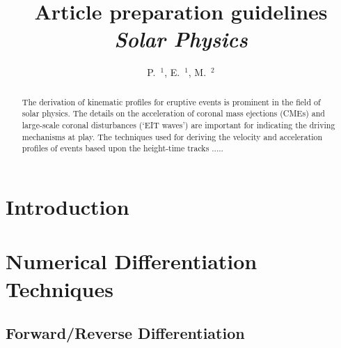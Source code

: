 \documentclass[namedreferences]{SolarPhysics}
\begin{document}
\begin{article}

\begin{opening}

\title{Article preparation guidelines\\ {\it Solar Physics}}

\author{P.~$^{1}$\sep
        E.~$^{1}$\sep
        M.~$^{2}$      
       }


\begin{abstract}
The derivation of kinematic profiles for eruptive events is prominent in the field of solar physics. The details on the acceleration of coronal mass ejections (CMEs) and large-scale coronal disturbances (`EIT waves') are important for indicating the driving mechanisms at play. The techniques used for deriving the velocity and acceleration profiles of events based upon the height-time tracks .....


\end{abstract}
\end{opening}

\section{Introduction}
     \label{S-Introduction} 



 

\section{Numerical Differentiation Techniques} %
      \label{S-general}      

\subsection{Forward/Reverse Differentiation} %


\end{article}
\end{document}

